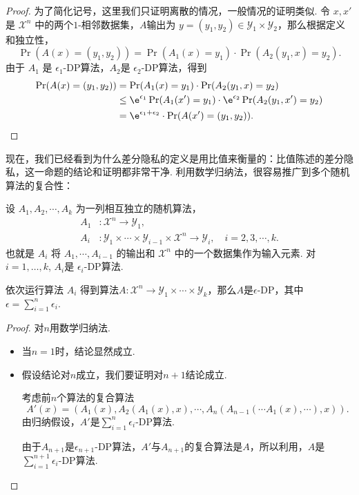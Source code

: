 \begin{proof}
为了简化记号，这里我们只证明离散的情况，一般情况的证明类似. 令 $x,x'$ 是 $\mathcal X^n$ 中的两个$1$-相邻数据集，$A$输出为 $y = (y_1, y_2) \in \mathcal Y_1 \times \mathcal Y_2$，那么根据定义和独立性，
    \[
    \Pr(A(x) = (y_1, y_2)) = \Pr(A_1(x) = y_1) \cdot \Pr(A_2(y_1, x) = y_2).
    \]
由于 $A_1$ 是 $\epsilon_1$-DP算法，$A_2$是 $\epsilon_2$-DP算法，得到
    \[
    \begin{aligned}
        \Pr(A(x) = (y_1, y_2)) &= \Pr(A_1(x) = y_1) \cdot \Pr(A_2(y_1, x) = y_2)\\
        &\leq \e^{\epsilon_1} \Pr(A_1(x') = y_1) \cdot \e^{\epsilon_2} \Pr(A_2(y_1, x') = y_2) \\
        &= \e^{\epsilon_1 + \epsilon_2} \cdot \Pr(A(x') = (y_1, y_2)).
    \end{aligned}
    \]
\end{proof}

现在，我们已经看到为什么差分隐私的定义是用比值来衡量的：比值陈述的差分隐私，这一命题的结论和证明都非常干净. 利用数学归纳法，很容易推广到多个随机算法的复合性：

\begin{proposition}\label{prop:composition-multi}
    设 $A_1, A_2, \cdots , A_k$ 为一列相互独立的随机算法， 
    \begin{align*}
        A_1&: \mathcal X^n \to \mathcal Y_1,\\
        A_i&: \mathcal Y_1 \times \cdots \times \mathcal Y_{i-1} \times \mathcal X^n \to \mathcal Y_i,\quad i = 2, 3, \cdots, k.
    \end{align*}
    也就是 $A_i$ 将 $A_1, \cdots, A_{i-1}$ 的输出和 $\mathcal X^n$ 中的一个数据集作为输入元素. 对$i=1,\dots,k$, $A_i$是 $\epsilon_i$-DP算法. 
        
    依次运行算法 $A_i$ 得到算法$A : \mathcal X^n \to \mathcal Y_1 \times \cdots \times \mathcal Y_k$，那么$A$是$\epsilon$-DP，其中$\epsilon = \sum_{i=1}^n \epsilon_i$.
\end{proposition}
\begin{proof}
    对$n$用数学归纳法. 
    \begin{itemize}
        \item 当$n=1$时，结论显然成立.
        \item 假设结论对$n$成立，我们要证明对$n+1$结论成立.
        
        考虑前$n$个算法的复合算法
        \[A'(x) = (A_1(x), A_2(A_1(x), x), \cdots, A_n(A_{n-1}(\cdots A_1(x), \cdots), x)).\]
        由归纳假设，$A'$是$\sum_{i=1}^n\epsilon_i$-DP算法. 
        
        由于$A_{n+1}$是$\epsilon_{n+1}$-DP算法，$A'$与$A_{n+1}$的复合算法是$A$，所以利用，$A$是$\sum_{i=1}^{n+1}\epsilon_i$-DP算法.
    \end{itemize}
\end{proof}


